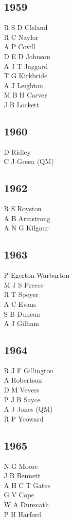 \begin{multicols}{3}
  \subsection*{1959}
  R S D Cleland \\
  R C Naylor \\
  A P Covill \\
  D E D Johnson \\
  A J T Jaggard \\
  T G Kirkbride \\
  A J Leighton \\
  M B H Carver \\
  J B Lockett \\
  \subsection*{1960}
  D Ridley \\
  C J Green (QM) \\
  \subsection*{1962}
  R S Royston \\
  A B Armstrong \\
  A N G Kilgour \\
  \subsection*{1963}
  P Egerton-Warburton \\
  M J S Preece \\
  R T Speyer \\
  A C Evans \\
  S B Duncan \\
  A J Gilham \\
  \subsection*{1964}
  R J F Gillington \\
  A Robertson \\
  D M Vevers \\
  P J B Sayce \\
  A J Jones (QM) \\
  R P Yeoward \\
  \subsection*{1965}
  N G Moore \\
  J B Bennett \\
  A H C T Gates \\
  G V Cope \\
  W A Dunscath \\
  P H Harford \\

\end{multicols}
